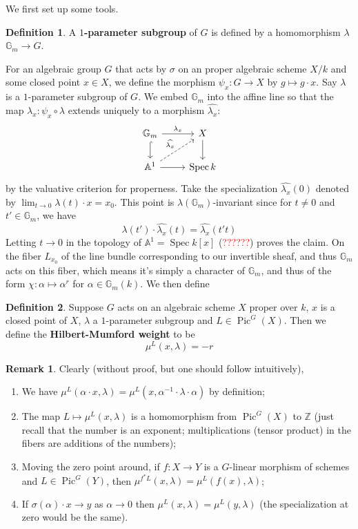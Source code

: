 \documentclass[12pt]{article}
\theoremstyle{remark}
\theoremstyle{definition}
\newtheorem{remark}{Remark}[section]
\newtheorem{definition}{Definition}[section]
\newcommand{\s}[0]{\sigma}
\newcommand{\Z}[0]{\mathbb{Z}}
\newcommand{\G}[0]{\mathbb{G}}
\newcommand{\Spec}[0]{\operatorname{Spec}}
\newcommand{\Pic}[0]{\operatorname{Pic}}
\begin{document}
    We first set up some tools.
    \begin{definition}
        A \textbf{$1$-parameter subgroup} of $G$ is defined by a homomorphism $\lambda$ $\G_m\to G$.
    \end{definition}
    For an algebraic group $G$ that acts by $\s$ on an proper algebraic scheme $X/k$ and some closed point $x\in X$, we define the morphism $\psi_x:G\to X$ by $g\mapsto g\cdot x$. Say $\lambda$ is a $1$-parameter subgroup of $G$. We embed $\G_m$ into the affine line so that the map $\lambda_x:\psi_x\circ\lambda$ extends uniquely to a morphism 
    $\widehat{\lambda_x}$:
    \[
        \begin{tikzcd}
            \mathbb G_m \arrow[r, "\lambda_x"] \arrow[d, hook]              & X \arrow[d] \\
            \mathbb A^1 \arrow[r] \arrow[ru, "\widehat{\lambda_x}", dashed] & \Spec k    
        \end{tikzcd}  
    \]
    by the valuative criterion for properness. Take the specialization $\widehat{\lambda_x}(0)$ denoted by $\lim_{t\to 0}\lambda(t)\cdot x=x_0$. This point is $\lambda(\G_m)$-invariant since for $t\neq 0$ and $t'\in\G_m$, we have
    \[\lambda(t')\cdot \widehat{\lambda_x}(t)=\widehat{\lambda_x}(t't)\]
    Letting $t\to 0$ in the topology of $\mathbb A^1=\Spec k[x]$ (\textcolor{red}{??????}) proves the claim. On the fiber $L_{x_0}$ of the line bundle corresponding to our invertible sheaf, and thus $\G_m$ acts on this fiber, which means it's simply a character of $\G_m$, and thus of the form $\chi:\alpha\mapsto\alpha^r$ for $\alpha\in \G_m(k)$. We then define
    \begin{definition}
        Suppose $G$ acts on an algebraic scheme $X$ proper over $k$, $x$ is a closed point of $X$, $\lambda$ a $1$-parameter subgroup and $L\in\Pic^G(X)$. Then we define the \textbf{Hilbert-Mumford weight} to be
        \[\mu^L(x,\lambda)=-r\]
    \end{definition}
    \begin{remark}
        Clearly (without proof, but one should follow intuitively), 
        \begin{enumerate}[\normalfont(i)]
            \item We have $\mu^L(\alpha\cdot x,\lambda)=\mu^L(x,\alpha^{-1}\cdot\lambda\cdot\alpha)$ by definition;
            \item The map $L\mapsto\mu^L(x,\lambda)$ is a homomorphism from $\Pic^G(X)$ to $\Z$ (just recall that the number is an exponent; multiplications (tensor product) in the fibers are additions of the numbers);
            \item Moving the zero point around, if $f:X\to Y$ is a $G$-linear morphism of schemes and $L\in\Pic^G(Y)$, then $\mu^{f^*L}(x,\lambda)=\mu^L(f(x), \lambda)$;
            \item If $\s(\alpha)\cdot x\to y$ as $\alpha\to 0$ then $\mu^L(x,\lambda)=\mu^L(y,\lambda)$ (the specialization at zero would be the same).
        \end{enumerate}
    \end{remark}
\end{document}
